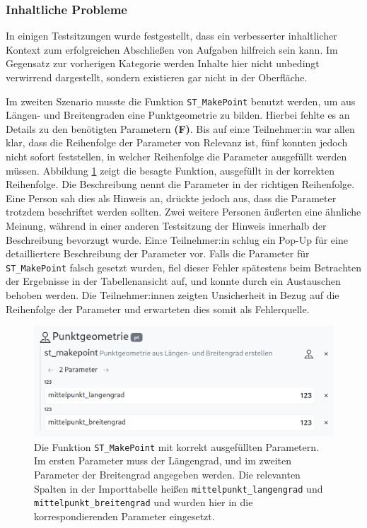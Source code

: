 \subsubsection{Inhaltliche Probleme}
In einigen Testsitzungen wurde festgestellt, dass ein verbesserter inhaltlicher Kontext zum erfolgreichen Abschließen von Aufgaben hilfreich sein kann. Im Gegensatz zur vorherigen Kategorie werden Inhalte hier nicht unbedingt verwirrend dargestellt, sondern existieren gar nicht in der Oberfläche.

Im zweiten Szenario musste die Funktion \texttt{ST\_MakePoint} benutzt werden, um aus Längen- und Breitengraden eine Punktgeometrie zu bilden. Hierbei fehlte es an Details zu den benötigten Parametern \textbf{(F)}. Bis auf ein:e Teilnehmer:in war allen klar, dass die Reihenfolge der Parameter von Relevanz ist, fünf konnten jedoch nicht sofort feststellen, in welcher Reihenfolge die Parameter ausgefüllt werden müssen. Abbildung \ref{fig:parameters} zeigt die besagte Funktion, ausgefüllt in der korrekten Reihenfolge. Die Beschreibung nennt die Parameter in der richtigen Reihenfolge. Eine Person sah dies als Hinweis an, drückte jedoch aus, dass die Parameter trotzdem beschriftet werden sollten. Zwei weitere Personen äußerten eine ähnliche Meinung, während in einer anderen Testsitzung der Hinweis innerhalb der Beschreibung bevorzugt wurde. Ein:e Teilnehmer:in schlug ein Pop-Up für eine detailliertere Beschreibung der Parameter vor. Falls die Parameter für \texttt{ST\_MakePoint} falsch gesetzt wurden, fiel dieser Fehler spätestens beim Betrachten der Ergebnisse in der Tabellenansicht auf, und konnte durch ein Austauschen behoben werden. Die Teilnehmer:innen zeigten Unsicherheit in Bezug auf die Reihenfolge der Parameter und erwarteten dies somit als Fehlerquelle.

\begin{figure}[!ht]
  \centering
  \includegraphics[width=.825\textwidth]{assets/st-makepoint.png}
  \caption[Die Funktion \texttt{ST\_MakePoint} im Block-Editor]{Die Funktion \texttt{ST\_MakePoint} mit korrekt ausgefüllten Parametern. Im ersten Parameter muss der Längengrad, und im zweiten Parameter der Breitengrad angegeben werden. Die relevanten Spalten in der Importtabelle heißen \texttt{mittelpunkt\_langengrad} und \texttt{mittelpunkt\_breitengrad} und wurden hier in die korrespondierenden Parameter eingesetzt.}
  \label{fig:parameters}
\end{figure}

